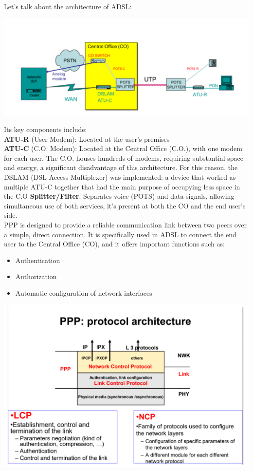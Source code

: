 \documentclass[11pt, a4paper]{article}
\begin{document}
Let's talk about the architecture of ADSL:
\begin{center}
    \includegraphics[scale=0.5]{img/AccessNetworks/XDSL/architecture.png}
\end{center}
Its key components include:\\
\textbf{ATU-R} (User Modem): Located at the user's premises\\
\textbf{ATU-C} (C.O. Modem): Located at the Central Office (C.O.), with one modem for each user. The C.O. houses hundreds of modems, requiring substantial space and energy, a significant disadvantage of this architecture. For this reason, the DSLAM (DSL Access Multiplexer) was implemented: a device that worked as multiple ATU-C together that had the main purpose of occupying less space in the C.O
\textbf{Splitter/Filter}: Separates voice (POTS) and data signals, allowing simultaneous use of both services, it's present at both the CO and the end user's side.\\
PPP is designed to provide a reliable communication link between two peers over a simple,
direct connection. It is specifically used in ADSL to connect the end user to the Central Office (CO), and it offers important functions such as:
\begin{itemize}
    \item Authentication
    \item Authorization
    \item Automatic configuration of network interfaces
\end{itemize}
\begin{center}
    \includegraphics[scale=0.5]{img/AccessNetworks/XDSL/PPP.png}
\end{center}
\end{document}
